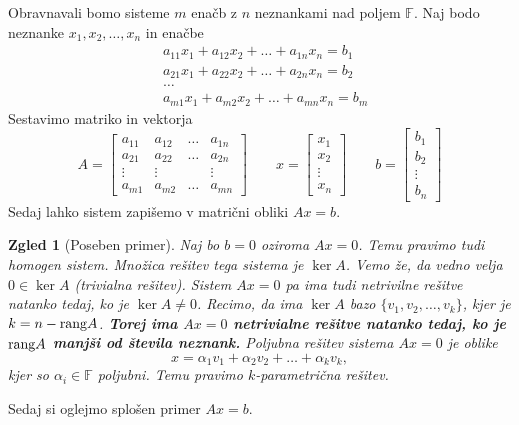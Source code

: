 \documentclass[10pt, a4paper]{article}
\newtheorem{zgled}{Zgled}[section]
\newcommand{\F}{\mathbb {F}}
\newcommand{\rang}{\textup{\text{rang}}}
\begin{document}
Obravnavali bomo sisteme $m$ enačb z $n$ neznankami nad poljem $\F$.
Naj bodo neznanke $x_1, x_2, \dots, x_n$ in enačbe
\begin{align*}
    &a_{11} x_1 + a_{12} x_2 + \dots + a_{1n} x_n = b_1\\
    &a_{21} x_1 + a_{22} x_2 + \dots + a_{2n} x_n = b_2\\
    &\dots\\
    &a_{m1} x_1 + a_{m2} x_2 + \dots + a_{mn} x_n = b_m
\end{align*}
Sestavimo matriko in vektorja
\begin{equation*}
    A = \begin{bmatrix}
        a_{11} & a_{12} & \dots & a_{1n}\\
        a_{21} & a_{22} & \dots & a_{2n}\\
        \vdots & \vdots &  & \vdots \\
        a_{m1} & a_{m2} & \dots & a_{mn}
    \end{bmatrix} \qquad
    x = \begin{bmatrix}
        x_1\\ x_2\\ \vdots\\ x_n
    \end{bmatrix}
    \qquad b = \begin{bmatrix}
        b_1\\ b_2\\ \vdots\\ b_n
    \end{bmatrix}
\end{equation*}
Sedaj lahko sistem zapišemo v matrični obliki $Ax = b$.

\begin{zgled}[Poseben primer]
    Naj bo $b = 0$ oziroma $Ax = 0$.
    Temu pravimo tudi homogen sistem.
    Množica rešitev tega sistema je $\ker A$.
    Vemo že, da vedno velja $0 \in \ker A$ (trivialna rešitev).
    Sistem $Ax = 0$ pa ima tudi netrivilne rešitve natanko tedaj, ko je $\ker A \neq {0}$.
    Recimo, da ima $\ker A$ bazo $\{v_1, v_2, \dots, v_k\}$, kjer je $k = n - \rang A$.
    \textbf{Torej ima $Ax = 0$ netrivialne rešitve natanko tedaj, ko je $\rang A$ manjši od števila neznank.}
    Poljubna rešitev sistema $Ax = 0$ je oblike $$x = \alpha_1 v_1 + \alpha_2 v_2 + \dots + \alpha_k v_k,$$
    kjer so $\alpha_i \in \F$ poljubni.
    Temu pravimo $k$-parametrična rešitev.
\end{zgled}

Sedaj si oglejmo splošen primer $Ax = b$.
\end{document}
